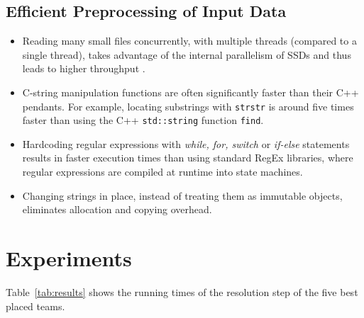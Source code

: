 \documentclass[sigconf]{acmart}
\begin{document}
\subsection{Efficient Preprocessing of Input Data}
\label{sub:sec:preprocessing}



\begin{itemize}
\item Reading many small files concurrently, with multiple threads (compared to a single thread), takes advantage of the internal parallelism of SSDs and thus leads to higher throughput \cite{Zhuang2016}.

\item C-string manipulation functions are often significantly faster than their C++ pendants. For example, locating substrings with \texttt{strstr} is around five times faster than using the C++ \texttt{std::string} function \texttt{find}.

\item Hardcoding regular expressions with \emph{while, for, switch} or \emph{if-else} statements results in faster execution times than using standard RegEx libraries, where regular expressions are compiled at runtime into state machines.

\item Changing strings in place, instead of treating them as immutable objects, eliminates allocation and copying overhead.

\end{itemize}


\section{Experiments}

Table~\ref{tab:results} shows the running times of the resolution step of the five best placed teams.


\begin{table}[htbp]
  \caption{Comparison of the F-measure and the running times of the resolution step of the five best placed teams. The input data for the resolution step consisted of 29{,}787 in JSON formatted e-commerce websites. Measurements were taken on a
laptop running Ubuntu 19.04 with 16 GB of RAM and two Intel Core i5-4310U CPUs. The underlying SSD was a 500\,GB 860 EVO mSATA. We cleared the page cache, dentries, and inodes before each run to avoid reading the input data from RAM instead of the SSD.}
  \label{tab:results}
\end{table}
\end{document}
